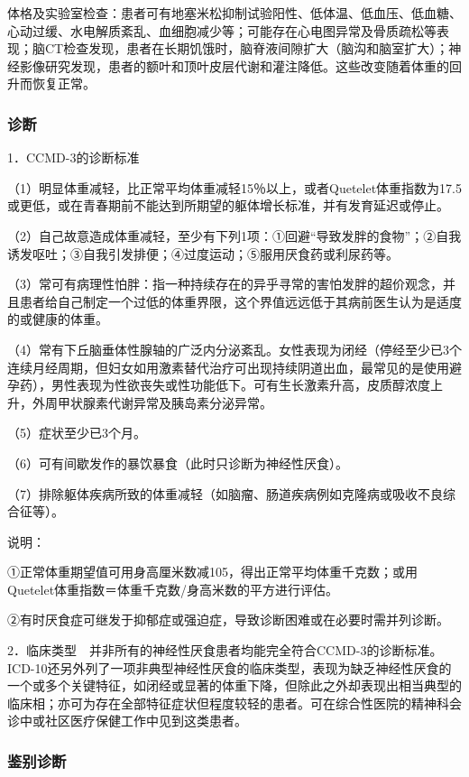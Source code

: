体格及实验室检查：患者可有地塞米松抑制试验阳性、低体温、低血压、低血糖、心动过缓、水电解质紊乱、血细胞减少等；可能存在心电图异常及骨质疏松等表现；脑CT检查发现，患者在长期饥饿时，脑脊液间隙扩大（脑沟和脑室扩大）；神经影像研究发现，患者的额叶和顶叶皮层代谢和灌注降低。这些改变随着体重的回升而恢复正常。

\subsubsection{诊断}

1．CCMD-3的诊断标准

（1）明显体重减轻，比正常平均体重减轻15％以上，或者Quetelet体重指数为17.5或更低，或在青春期前不能达到所期望的躯体增长标准，并有发育延迟或停止。

（2）自己故意造成体重减轻，至少有下列1项：①回避“导致发胖的食物”；②自我诱发呕吐；③自我引发排便；④过度运动；⑤服用厌食药或利尿药等。

（3）常可有病理性怕胖：指一种持续存在的异乎寻常的害怕发胖的超价观念，并且患者给自己制定一个过低的体重界限，这个界值远远低于其病前医生认为是适度的或健康的体重。

（4）常有下丘脑垂体性腺轴的广泛内分泌紊乱。女性表现为闭经（停经至少已3个连续月经周期，但妇女如用激素替代治疗可出现持续阴道出血，最常见的是使用避孕药），男性表现为性欲丧失或性功能低下。可有生长激素升高，皮质醇浓度上升，外周甲状腺素代谢异常及胰岛素分泌异常。

（5）症状至少已3个月。

（6）可有间歇发作的暴饮暴食（此时只诊断为神经性厌食）。

（7）排除躯体疾病所致的体重减轻（如脑瘤、肠道疾病例如克隆病或吸收不良综合征等）。

说明：

①正常体重期望值可用身高厘米数减105，得出正常平均体重千克数；或用Quetelet体重指数＝体重千克数/身高米数的平方进行评估。

②有时厌食症可继发于抑郁症或强迫症，导致诊断困难或在必要时需并列诊断。

2．临床类型　并非所有的神经性厌食患者均能完全符合CCMD-3的诊断标准。ICD-10还另外列了一项非典型神经性厌食的临床类型，表现为缺乏神经性厌食的一个或多个关键特征，如闭经或显著的体重下降，但除此之外却表现出相当典型的临床相；亦可为存在全部特征症状但程度较轻的患者。可在综合性医院的精神科会诊中或社区医疗保健工作中见到这类患者。

\subsubsection{鉴别诊断}

